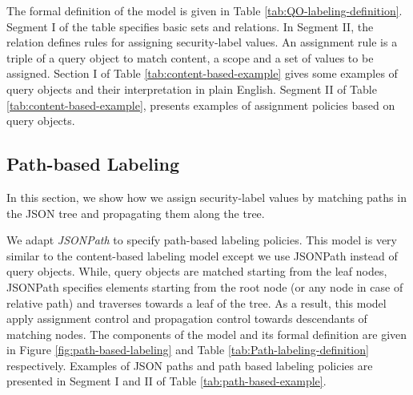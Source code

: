 The formal definition of the model is given in Table \ref{tab:QO-labeling-definition}. Segment I of the table specifies basic sets and relations. In Segment II, the relation \textit{ } defines rules for assigning security-label values. An assignment rule is a triple of a query object to match content, a scope and a set of values to be assigned.  Section I of  Table \ref{tab:content-based-example} gives some examples of query objects and their interpretation in plain English.  Segment II of Table \ref{tab:content-based-example}, presents examples of assignment policies based on query objects.





\subsection{Path-based Labeling}

In this section, we show how we assign security-label values by matching paths in the JSON tree and propagating them along the tree. 

We adapt \textit{JSONPath} \cite{JSONPath} to specify path-based labeling policies. This model is very similar to the content-based labeling model except we use JSONPath instead of query objects. While, query objects are matched starting from the leaf nodes, JSONPath specifies elements starting from the root node (or any node in case of relative path) and traverses towards a leaf of the tree. As a result, this model apply assignment control and propagation control towards descendants of matching nodes.  The components of the model and its formal definition are given in Figure \ref{fig:path-based-labeling} and Table \ref{tab:Path-labeling-definition} respectively. Examples of JSON paths and path based labeling policies are presented in Segment I and II of Table \ref{tab:path-based-example}.


